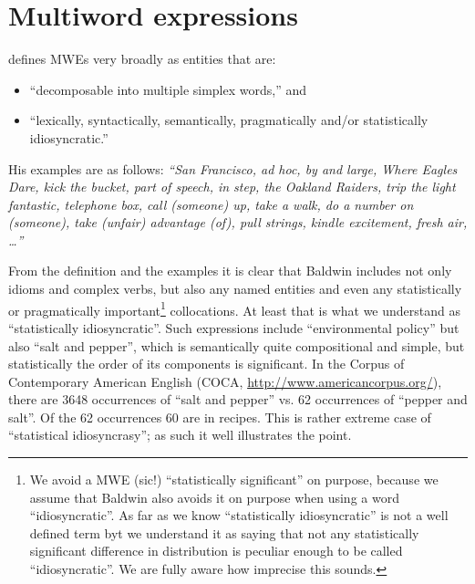 
\chapter{Multiword expressions}
\label{mwe}
%
%
%
%

\citet{baldwin:2004} defines MWEs very broadly as entities that are:
\begin{itemize}
\item
``decomposable into multiple simplex words,'' and
\item
``lexically, syntactically, semantically, pragmatically and/or statistically idiosyncratic.''
\end{itemize}

His examples are as follows: \emph{``San Francisco, ad hoc, by and large, Where Eagles Dare, kick the bucket, part of speech, in step, the Oakland Raiders, trip the light fantastic, telephone box, call (someone) up, take a walk, do a number on (someone), take (unfair) advantage (of), pull strings, kindle excitement, fresh air, \ldots''}

From the definition and the examples it is clear that Baldwin includes not only idioms and complex verbs, but also any named entities and even any statistically or pragmatically important\footnote{We avoid a MWE (sic!) ``statistically significant'' on purpose, because we assume that Baldwin also avoids it on purpose when using a word ``idiosyncratic''. As far as we know ``statistically idiosyncratic'' is not a well defined term byt we understand it as saying that not any statistically significant difference in distribution is peculiar enough to be called ``idiosyncratic''. We are fully aware how imprecise this sounds.} collocations. At least that is what we understand as ``statistically idiosyncratic''. Such expressions include ``environmental policy'' but also ``salt and pepper'', which is semantically quite compositional and simple, but statistically the order of its components is significant. In the Corpus of Contemporary American English (COCA, \url{http://www.americancorpus.org/}), there are 3648 occurrences of ``salt and pepper'' vs. 62 occurrences of ``pepper and salt''. Of the 62 occurrences 60 are in recipes. This is rather extreme case of ``statistical idiosyncrasy''; as such it well illustrates the point.

